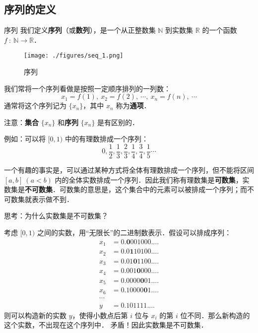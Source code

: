
\begin{issues}
\issueTODO
\issueDraft
{}
\end{issues}

\subsection{序列的定义}
\begin{definition}{序列}
我们定义\textbf{序列}（或\textbf{数列}），是一个从正整数集 $\mathbb{N}$  到实数集 $\mathbb{R}$ 的一个函数 $f\ :\ \mathbb{N}\rightarrow \mathbb{R}$．
\end{definition}
\begin{figure}[ht]
\centering
\texttt{[image: ./figures/seq\_1.png]}
\caption{序列} \label{seq_fig1}
\end{figure}
我们常将一个序列看做是按照一定顺序排列的一列数：
$$
x_1=f(1),\ x_2=f(2),\ \cdots,\ x_n=f(n),\ \cdots
$$
通常将这个序列记为 $\{x_n\}$，其中 $x_n$ 称为\textbf{通项}．

注意：\textbf{集合} $\{x_n\}$ 和\textbf{序列} $\{x_n\}$ 是有区别的．

例如：可以将 $[0,1)$ 中的有理数排成一个序列：
$$
0,\frac{1}{2},\frac{1}{3},\frac{2}{3},\frac{1}{4},\frac{3}{4},\frac{1}{5}\cdots
$$

一个有趣的事实是，可以通过某种方式将全体有理数排成一个序列，但不能将区间 $[a,b]\ (a<b)$ 内的全体实数排成一个序列．因此我们称有理数集是\textbf{可数集}，实数集是\textbf{不可数集}．可数集的意思是，这个集合中的元素可以被排成一个序列；而不可数集就表示做不到．

\begin{example}{}
思考：为什么实数集是不可数集？

考虑 $[0,1)$ 之间的实数，用“无限长”的二进制数表示．假设可以排成序列： 
\begin{equation}
\begin{aligned}
x_1&=0.\boldsymbol 0001000....\\
x_2&=0.0\boldsymbol 110100....\\
x_3&=0.01\boldsymbol 01100....\\
x_4&=0.001\boldsymbol 0000....\\
x_5&=0.0000\boldsymbol 001....\\
x_6&=0.10000\boldsymbol 01....\\
\cdots
\\
y&=0.101111....
\end{aligned}
\end{equation}
​则可以构造新的实数 $y$，使得小数点后第 $i$ 位与 $x_i$ 的第 $i$ 位不同．那么新构造的这个实数，不出现在这个序列中．
矛盾！因此实数集是不可数集．
\end{example}

​		

​		